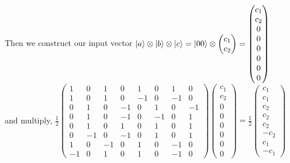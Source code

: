 \documentclass[10pt]{article}
\theoremstyle{definition}
\begin{document}
Then we construct our input vector $\ket{a}\otimes \ket{b}\otimes \ket{c}=\ket{00}\otimes\begin{pmatrix}
    c_1 \\
    c_2
  \end{pmatrix}
  =\begin{pmatrix}
    c_1 \\
    c_2 \\
    0   \\
    0   \\
    0   \\
    0   \\
    0   \\
    0
  \end{pmatrix}$\\ and multiply,
$\frac{1}{2}\begin{pmatrix}
    1  & 0  & 1  & 0  & 1  & 0  & 1  & 0  \\
    1  & 0  & 1  & 0  & -1 & 0  & -1 & 0  \\
    0  & 1  & 0  & -1 & 0  & 1  & 0  & -1 \\
    0  & 1  & 0  & -1 & 0  & -1 & 0  & 1  \\
    0  & 1  & 0  & 1  & 0  & 1  & 0  & 1  \\
    0  & -1 & 0  & -1 & 0  & 1  & 0  & 1  \\
    1  & 0  & -1 & 0  & 1  & 0  & -1 & 0  \\
    -1 & 0  & 1  & 0  & 1  & 0  & -1 & 0
  \end{pmatrix}\begin{pmatrix}
    c_1 \\
    c_2 \\
    0   \\
    0   \\
    0   \\
    0   \\
    0   \\
    0
  \end{pmatrix}=
  \frac{1}{2}\begin{pmatrix}c_1  \\
    c_1  \\
    c_2  \\
    c_2  \\
    c_2  \\
    -c_2 \\
    c_1  \\
    -c_1
  \end{pmatrix}$
\end{document}
